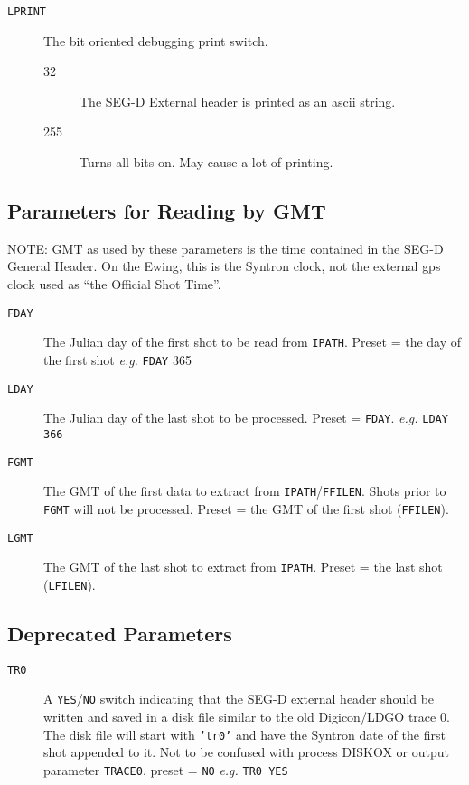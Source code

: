 \begin{description}
\item[\texttt{LPRINT}] The bit oriented debugging print switch.
\begin{description}
       \item[32] The SEG-D External header is printed as an \gls{ascii} string.
       \item[255] Turns all bits on.  May cause a lot of printing.
\end{description}
\end{description}



\subsection{Parameters for Reading by GMT}

NOTE:  GMT as used by these parameters is the time contained
       in the SEG-D General Header.  On the Ewing, this is the
       Syntron clock, not the external \gls{gps} clock used as
       ``the Official Shot Time''.

\begin{description}
\item[\texttt{FDAY}] The Julian day of the first \gls{shot} to be read from \texttt{IPATH}.
         Preset = the day of the first \gls{shot}    \textit{e.g.} \texttt{FDAY} 365

\item[\texttt{LDAY}] The Julian day of the last \gls{shot} to be processed.
         Preset = \texttt{FDAY}.    \textit{e.g.} \texttt{LDAY 366}

\item[\texttt{FGMT}] The GMT of the first data to extract from \texttt{IPATH}/\texttt{FFILEN}.  Shots
         prior to \texttt{FGMT} will not be processed.
         Preset = the GMT of the first \gls{shot} (\texttt{FFILEN}).

\item[\texttt{LGMT}] The GMT of the last \gls{shot} to extract from \texttt{IPATH}.
         Preset = the last \gls{shot} (\texttt{LFILEN}).
\end{description}

\subsection{Deprecated Parameters}

\begin{description}
    \item[\texttt{TR0}] A \texttt{YES}/\texttt{NO} switch indicating that the SEG-D external header
         should be written and saved in a disk file similar to the
         old Digicon/LDGO trace 0.  The disk file will start with \texttt{'tr0'}
         and have the Syntron date of the first \gls{shot} appended to it.
         Not to be confused with process DISKOX or output parameter
         \texttt{TRACE0}.
         \Gls{preset} = \texttt{NO}      \textit{e.g.} \texttt{TR0 YES}
\end{description}

